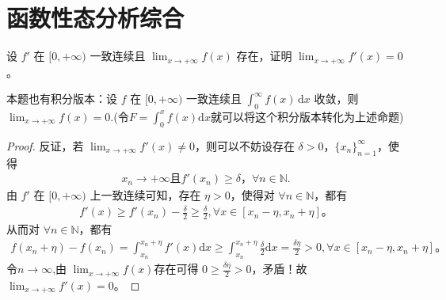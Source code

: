 \documentclass[../../main.tex]{subfiles}
\begin{document}
\section{函数性态分析综合}

\begin{proposition}\label{proposition:经典导数一致连续问题}
设 $f'$ 在 $[0,+\infty)$ 一致连续且 $\lim_{x \to +\infty} f(x)$ 存在，证明 $\lim_{x \to +\infty} f'(x) = 0$。
\end{proposition}
\begin{note}
本题也有积分版本：设 $f$ 在 $[0,+\infty)$ 一致连续且 $\int_{0}^{\infty} f(x) \, \mathrm{d}x$ 收敛，则 $\lim_{x \to +\infty} f(x) = 0$.(令$F=\int_0^x{f\left( x \right) \mathrm{d}x}$就可以将这个积分版本转化为上述命题)
\end{note}
\begin{proof}
反证，若 $\lim_{x\rightarrow +\infty} f'(x) \ne 0$，则可以不妨设存在 $\delta >0$，$\{ x_n \}_{n=1}^{\infty}$，使得
\begin{align*}
x_n\rightarrow +\infty \text{且} f'(x_n) \geqslant \delta，\forall n\in \mathbb{N}.    
\end{align*}
由 $f'$ 在 $[0,+\infty)$ 上一致连续可知，存在 $\eta >0$，使得对 $\forall n\in \mathbb{N}$，都有
\begin{align*}
f'(x) \geqslant f'(x_n) -\frac{\delta}{2} \geqslant \frac{\delta}{2}, \forall x\in [x_n-\eta ,x_n+\eta] 。
\end{align*}
从而对 $\forall n\in \mathbb{N}$，都有
\begin{align*}
f(x_n+\eta) -f(x_n) =\int_{x_n}^{x_n+\eta} f'(x) \mathrm{d}x \geqslant \int_{x_n}^{x_n+\eta} \frac{\delta}{2} \mathrm{d}x = \frac{\delta \eta}{2} > 0, \forall x\in [x_n-\eta ,x_n+\eta] 。
\end{align*}
令$n\rightarrow \infty$,由 $\lim_{x\rightarrow +\infty} f(x) $存在可得 $0 \geqslant \frac{\delta \eta}{2} > 0$，矛盾！故 $\lim_{x\rightarrow +\infty} f'(x) =0$。
\end{proof}
\end{document}
